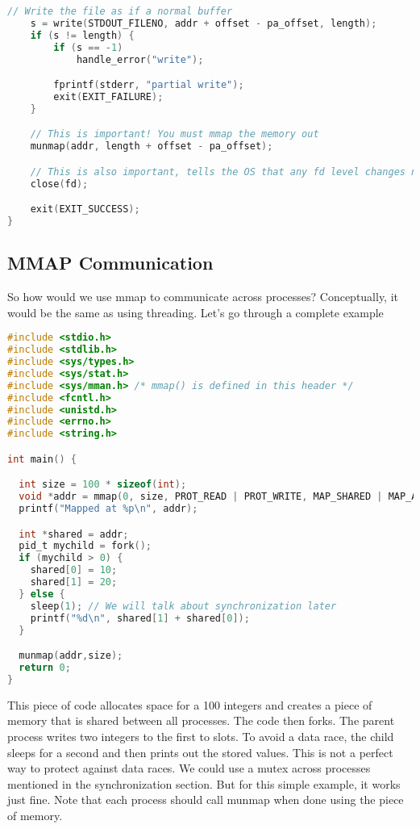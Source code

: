 \begin{lstlisting}[language=C]
    // Write the file as if a normal buffer
    s = write(STDOUT_FILENO, addr + offset - pa_offset, length);
    if (s != length) {
        if (s == -1)
            handle_error("write");

        fprintf(stderr, "partial write");
        exit(EXIT_FAILURE);
    }

    // This is important! You must mmap the memory out
    munmap(addr, length + offset - pa_offset);

    // This is also important, tells the OS that any fd level changes need to be addressed
    close(fd);

    exit(EXIT_SUCCESS);
}
\end{lstlisting}

\subsection{MMAP Communication}

So how would we use mmap to communicate across processes?
Conceptually, it would be the same as using threading.
Let's go through a complete example

\begin{lstlisting}[language=C]
#include <stdio.h>
#include <stdlib.h>
#include <sys/types.h>
#include <sys/stat.h>
#include <sys/mman.h> /* mmap() is defined in this header */
#include <fcntl.h>
#include <unistd.h>
#include <errno.h>
#include <string.h>

int main() {

  int size = 100 * sizeof(int);
  void *addr = mmap(0, size, PROT_READ | PROT_WRITE, MAP_SHARED | MAP_ANONYMOUS, -1, 0);
  printf("Mapped at %p\n", addr);

  int *shared = addr;
  pid_t mychild = fork();
  if (mychild > 0) {
    shared[0] = 10;
    shared[1] = 20;
  } else {
    sleep(1); // We will talk about synchronization later
    printf("%d\n", shared[1] + shared[0]);
  }

  munmap(addr,size);
  return 0;
}
\end{lstlisting}

This piece of code allocates space for a 100 integers and creates a piece of memory that is shared between all processes.
The code then forks.
The parent process writes two integers to the first to slots.
To avoid a data race, the child sleeps for a second and then prints out the stored values.
This is not a perfect way to protect against data races.
We could use a mutex across processes mentioned in the synchronization section.
But for this simple example, it works just fine.
Note that each process should call munmap when done using the piece of memory.

